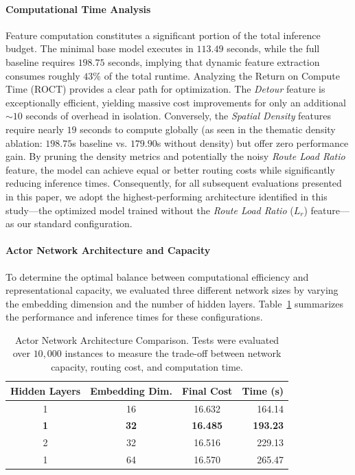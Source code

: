 \documentclass[letterpaper]{article} %
\begin{document}
\paragraph{Computational Time Analysis}
Feature computation constitutes a significant portion of the total inference budget. The minimal base model executes in $113.49$ seconds, while the full baseline requires $198.75$ seconds, implying that dynamic feature extraction consumes roughly $43\%$ of the total runtime. 
Analyzing the Return on Compute Time (ROCT) provides a clear path for optimization. The \textit{Detour} feature is exceptionally efficient, yielding massive cost improvements for only an additional $\sim 10$ seconds of overhead in isolation. Conversely, the \textit{Spatial Density} features require nearly $19$ seconds to compute globally (as seen in the thematic density ablation: $198.75$s baseline vs. $179.90$s without density) but offer zero performance gain. By pruning the density metrics and potentially the noisy \textit{Route Load Ratio} feature, the model can achieve equal or better routing costs while significantly reducing inference times. Consequently, for all subsequent evaluations presented in this paper, we adopt the highest-performing architecture identified in this study—the optimized model trained without the \textit{Route Load Ratio} ($L_r$) feature—as our standard configuration.

\paragraph{Actor Network Architecture and Capacity}

To determine the optimal balance between computational efficiency and representational capacity, we evaluated three different network sizes by varying the embedding dimension and the number of hidden layers. Table~\ref{tab:architecture_comp} summarizes the performance and inference times for these configurations.

\begin{table}[h]
\centering
\small
\caption{Actor Network Architecture Comparison. Tests were evaluated over $10{,}000$ instances to measure the trade-off between network capacity, routing cost, and computation time.}
\label{tab:architecture_comp}
\begin{tabular}{c c c r}
\toprule
\textbf{Hidden Layers} & \textbf{Embedding Dim.} & \textbf{Final Cost} & \textbf{Time (s)} \\
\midrule
1 & 16 & 16.632 & 164.14 \\
\textbf{1} & \textbf{32} & \textbf{16.485} & \textbf{193.23} \\
2 & 32 & 16.516 & 229.13 \\
1 & 64 & 16.570 & 265.47 \\
\bottomrule
\end{tabular}
\end{table}
\end{document}
